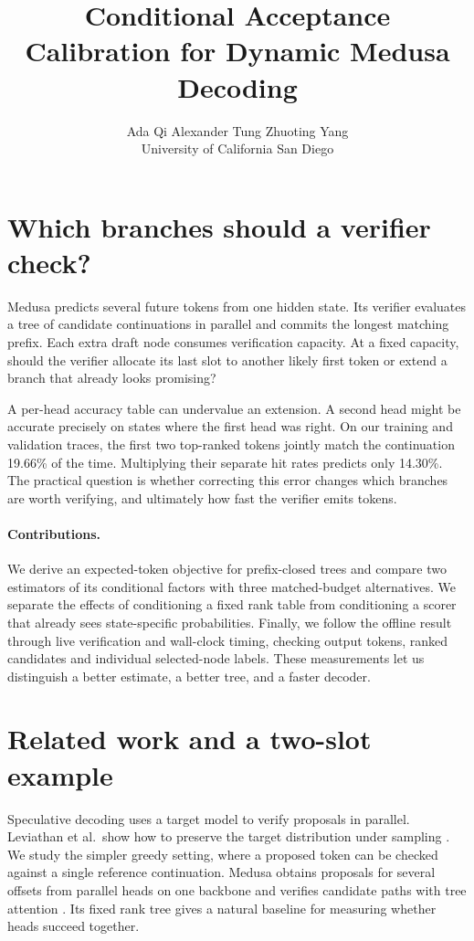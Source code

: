 \documentclass{article}
\title{Conditional Acceptance Calibration for Dynamic Medusa Decoding}
\author{Ada Qi \qquad Alexander Tung \qquad Zhuoting Yang\\University of California San Diego}
\begin{document}
\maketitle
\begin{abstract}

\end{abstract}
\section{Which branches should a verifier check?}
Medusa predicts several future tokens from one hidden state. Its verifier evaluates a tree of candidate continuations in parallel and commits the longest matching prefix. Each extra draft node consumes verification capacity. At a fixed capacity, should the verifier allocate its last slot to another likely first token or extend a branch that already looks promising?

A per-head accuracy table can undervalue an extension. A second head might be accurate precisely on states where the first head was right. On our training and validation traces, the first two top-ranked tokens jointly match the continuation 19.66\% of the time. Multiplying their separate hit rates predicts only 14.30\%. The practical question is whether correcting this error changes which branches are worth verifying, and ultimately how fast the verifier emits tokens.

\paragraph{Contributions.} We derive an expected-token objective for prefix-closed trees and compare two estimators of its conditional factors with three matched-budget alternatives. We separate the effects of conditioning a fixed rank table from conditioning a scorer that already sees state-specific probabilities. Finally, we follow the offline result through live verification and wall-clock timing, checking output tokens, ranked candidates and individual selected-node labels. These measurements let us distinguish a better estimate, a better tree, and a faster decoder.
\clearpage
\section{Related work and a two-slot example}
Speculative decoding uses a target model to verify proposals in parallel. Leviathan et al.\ show how to preserve the target distribution under sampling \cite{spec}. We study the simpler greedy setting, where a proposed token can be checked against a single reference continuation. Medusa obtains proposals for several offsets from parallel heads on one backbone and verifies candidate paths with tree attention \cite{medusa}. Its fixed rank tree gives a natural baseline for measuring whether heads succeed together.
\end{document}
